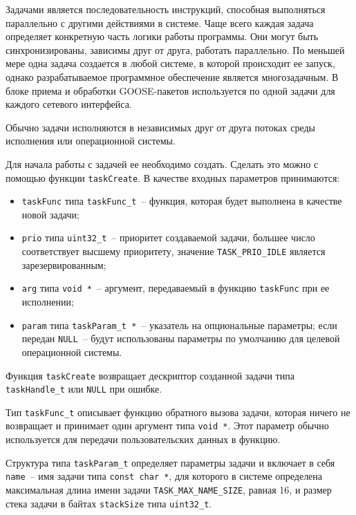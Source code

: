 Задачами является последовательность инструкций, способная выполняться параллельно с другими действиями в системе. Чаще всего каждая задача определяет конкретную часть логики
работы программы. Они могут быть синхронизированы, зависимы друг от друга, работать параллельно. По меньшей мере одна задача создается в любой системе, в которой происходит ее запуск, однако разрабатываемое программное обеспечение является многозадачным. В блоке приема и обработки GOOSE-пакетов используется по одной задачи для каждого сетевого интерфейса.

Обычно задачи исполняются в независимых друг от друга потоках среды исполнения
или операционной системы.

Для начала работы с задачей ее необходимо создать. Сделать это можно с помощью функции \lstinline{taskCreate}. В качестве входных параметров принимаются:

\begin{itemize}
    \item \lstinline{taskFunc} типа \lstinline{taskFunc_t}~-- функция, которая будет выполнена в качестве новой задачи;
    \item \lstinline{prio} типа \lstinline{uint32_t}~-- приоритет создаваемой задачи, большее число соответствует высшему приоритету, значение \lstinline{TASK_PRIO_IDLE} является зарезервированным;
    \item \lstinline{arg} типа \lstinline{void *}~-- аргумент, передаваемый в функцию \lstinline{taskFunc} при ее исполнении;
    \item \lstinline{param} типа \lstinline{taskParam_t *}~-- указатель на опциональные параметры; если передан \lstinline{NULL}~-- будут использованы параметры по умолчанию для целевой операционной системы.
\end{itemize}

Функция \lstinline{taskCreate} возвращает дескриптор созданной задачи типа \lstinline{taskHandle_t} или \lstinline{NULL} при ошибке.

Тип \lstinline{taskFunc_t} описывает функцию обратного вызова задачи, которая ничего
не возвращает и принимает один аргумент типа \lstinline{void *}. Этот параметр
обычно используется для передачи пользовательских данных в функцию.

Структура типа \lstinline{taskParam_t} определяет параметры задачи и включает в себя \lstinline{name}~-- имя задачи типа \lstinline{const char *}, для которого в системе
определена максимальная длина имени задачи \lstinline{TASK_MAX_NAME_SIZE}, равная 16, и размер стека задачи в байтах \lstinline{stackSize} типа \lstinline{uint32_t}.

